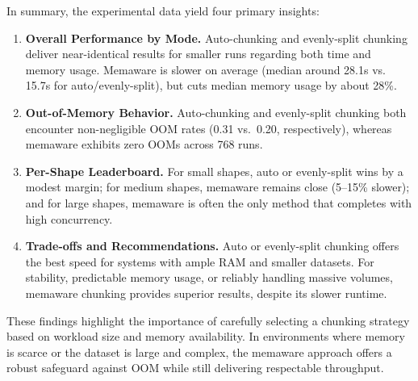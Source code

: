 In summary, the experimental data yield four primary insights:

\begin{enumerate}

    \item \textbf{Overall Performance by Mode.}
    Auto-chunking and evenly-split chunking deliver near-identical results for smaller runs regarding both time and memory usage.
    Memaware is slower on average (median around 28.1s vs. 15.7s for auto/evenly-split), but cuts median memory usage by about 28\%.

    \item \textbf{Out-of-Memory Behavior.}
    Auto-chunking and evenly-split chunking both encounter non-negligible \ac{OOM} rates (0.31 vs.\ 0.20, respectively), whereas memaware exhibits zero \ac{OOM}s across 768 runs.

    \item \textbf{Per-Shape Leaderboard.}
    For small shapes, auto or evenly-split wins by a modest margin; for medium shapes, memaware remains close (5--15\% slower); and for large shapes, memaware is often the only method that completes with high concurrency.

    \item \textbf{Trade-offs and Recommendations.}
    Auto or evenly-split chunking offers the best speed for systems with ample RAM and smaller datasets.
    For stability, predictable memory usage, or reliably handling massive volumes, memaware chunking provides superior results, despite its slower runtime.

\end{enumerate}

These findings highlight the importance of carefully selecting a chunking strategy based on workload size and memory availability.
In environments where memory is scarce or the dataset is large and complex, the memaware approach offers a robust safeguard against \ac{OOM} while still delivering respectable throughput.
